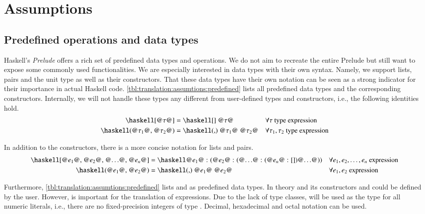 \section{Assumptions} \label{sec:translation:assumptions}
\subsection{Predefined operations and data types}
Haskell's \textit{Prelude} offers a rich set of predefined data types and operations.
We do not aim to recreate the entire Prelude but still want to expose some commonly used functionalities.
We are especially interested in data types with their own syntax.
Namely, we support lists, pairs and the unit type as well as their constructors.
That these data types have their own notation can be seen as a strong indicator for their importance in actual Haskell code.
\autoref{tbl:translation:assumtions:predefined} lists all predefined data types and the corresponding constructors.
Internally, we will not handle these types any different from user-defined types and constructors, i.e., the following identities hold.
\begin{align*}
  \haskellM{[@$\tau$@]}
  &= \haskellM{[] @$\tau$@}
  &&\forall \tau \text{ type expression}
  \\
  \haskellM{(@$\tau_1$@, @$\tau_2$@)}
  &= \haskellM{(,) @$\tau_1$@ @$\tau_2$@}
  &&\forall \tau_1, \tau_2 \text{ type expression}
\end{align*}

In addition to the constructors, there is a more concise notation for lists and pairs.
\begin{align}
  \haskellM{[@$e_1$@, @$e_2$@, @$\ldots$@, @$e_n$@]}
  &= \haskellM{@$e_1$@ : (@$e_2$@ : (@$\ldots$@ : (@$e_n$@ : [])@$\ldots$@))}
  &&\forall e_1, e_2, \ldots, e_n \text{ expression}
  \label{eqn:translation:assumtions:list-literal}
  \\
  \haskellM{(@$e_1$@, @$e_2$@)}
  &= \haskellM{(,) @$e_1$@ @$e_2$@}
  &&\forall e_1, e_2 \text{ expression}
  \label{eqn:translation:assumtions:pair-literal}
\end{align}

Furthermore, \autoref{tbl:translation:assumtions:predefined} lists  and  as predefined data types.
In theory  and its constructors  and  could be defined by the user.
However,  is important for the translation of  expressions.
Due to the lack of type classes,  will be used as the type for all numeric literals, i.e., there are no fixed-precision integers of type .
Decimal, hexadecimal and octal notation can be used.

